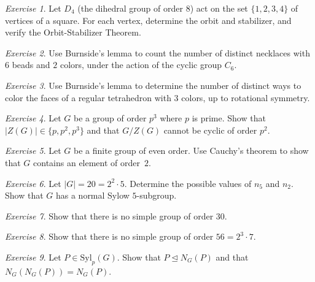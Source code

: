\documentclass[12pt,a4paper,openany]{book}
\theoremstyle{definition}
\theoremstyle{remark}
\newtheorem{exercise}{Exercise}[chapter]
\begin{document}
\begin{exercise}\label{exo:orbit-stabilizer-D4}
Let $D_4$ (the dihedral group of order $8$) act on the set
$\{1,2,3,4\}$ of vertices of a square.  For each vertex, determine
the orbit and stabilizer, and verify the Orbit-Stabilizer Theorem.
\end{exercise}

\begin{exercise}\label{exo:burnside-necklace}
Use Burnside's lemma to count the number of distinct necklaces with
$6$ beads and $2$ colors, under the action of the cyclic group $C_6$.
\end{exercise}

\begin{exercise}\label{exo:burnside-cube-faces}
Use Burnside's lemma to determine the number of distinct ways to color
the faces of a regular tetrahedron with $3$ colors, up to rotational
symmetry.
\end{exercise}

\begin{exercise}\label{exo:center-pgroup}
Let $G$ be a group of order $p^3$ where $p$ is prime.  Show that
$|Z(G)|\in\{p,p^2,p^3\}$ and that $G/Z(G)$ cannot be cyclic of
order $p^2$.
\end{exercise}

\begin{exercise}\label{exo:cauchy-application}
Let $G$ be a finite group of even order.  Use Cauchy's theorem to show
that $G$ contains an element of order~$2$.
\end{exercise}

\begin{exercise}\label{exo:sylow-order20}
Let $|G|=20=2^2\cdot 5$.  Determine the possible values of $n_5$ and
$n_2$.  Show that $G$ has a normal Sylow $5$-subgroup.
\end{exercise}

\begin{exercise}\label{exo:sylow-order30}
Show that there is no simple group of order $30$.
\end{exercise}

\begin{exercise}\label{exo:sylow-order56}
Show that there is no simple group of order $56=2^3\cdot 7$.
\end{exercise}

\begin{exercise}\label{exo:sylow-normal-in-normalizer}
Let $P\in\mathrm{Syl}_p(G)$.  Show that $P\trianglelefteq N_G(P)$
and that $N_G(N_G(P))=N_G(P)$.
\end{exercise}
\end{document}
